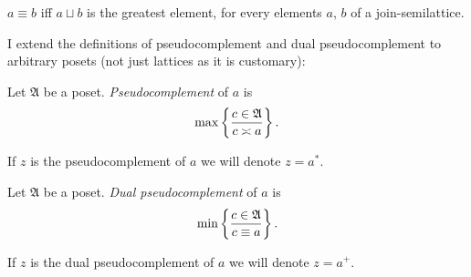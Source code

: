 \begin{obvious}
$a\equiv b$ iff $a\sqcup b$ is the greatest element, for every elements
$a$, $b$ of a join-semilattice.
\end{obvious}
I extend the definitions of pseudocomplement and dual pseudocomplement
to arbitrary posets (not just lattices as it is customary):
\begin{defn}
Let $\mathfrak{A}$ be a poset. \emph{Pseudocomplement} of $a$ is
\[
\max\left\{ \frac{c\in\mathfrak{A}}{c\asymp a}\right\}.
\]


If $z$ is the pseudocomplement of $a$ we will denote $z=a^{\ast}$.
\end{defn}

\begin{defn}
Let $\mathfrak{A}$ be a poset. \emph{Dual pseudocomplement} of $a$
is
\[
\min\left\{ \frac{c\in\mathfrak{A}}{c\equiv a}\right\}.
\]


If $z$ is the dual pseudocomplement of $a$ we will denote $z=a^{+}$.\end{defn}

